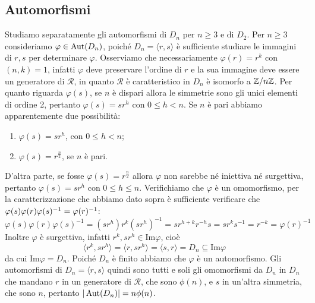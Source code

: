 \documentclass[11pt]{scrartcl}
\begin{document}
\subsection{Automorfismi}

Studiamo separatamente gli automorfismi di $D_n$ per $n \geqslant 3$ e di $D_2$.\newline
Per $n\geqslant 3$ consideriamo $\varphi \in \operatorname{Aut}(D_n)$, poiché $D_n = \langle
r, s\rangle$ è sufficiente studiare le immagini di $r, s$ per determinare $\varphi$.
Osserviamo che necessariamente $\varphi(r) = r^k$ con $(n, k) = 1$, infatti 
$\varphi$ deve preservare l'ordine di $r$ e la sua immagine deve essere un 
generatore di $\mathcal{R}$, in quanto $\mathcal{R}$ è caratteristico in $D_n$
è isomorfo a ${\mathbb Z}/n{\mathbb Z}$. Per quanto riguarda $\varphi(s)$, se $n$ è dispari allora le simmetrie
sono gli unici elementi di ordine 2, pertanto $\varphi(s) = sr^h$ con 
$0\leqslant h < n$. Se $n$ è pari abbiamo apparentemente due possibilità:
\begin{enumerate}[(1)]
    \item $\varphi(s) = sr^h$, con $0\leqslant h < n$;
    \item $\varphi(s) = r^{\frac n 2}$, se $n$ è pari.
\end{enumerate}

D'altra parte, se fosse $\varphi(s) = r^{\frac n 2}$ allora $\varphi$ non
sarebbe né iniettiva né surgettiva, pertanto $\varphi(s) = sr^h$ con 
$0\leqslant h \leqslant n$. Verifichiamo che $\varphi$ è un omomorfismo, per la 
caratterizzazione che abbiamo dato sopra è sufficiente verificare che
$\varphi(s)\varphi(r)\varphi(s)^{-1} = \nolinebreak\varphi(r)^{-1}$:
\[
    \varphi(s)\varphi(r)\varphi(s)^{-1} = (sr^h)r^k(sr^h)^{-1} = sr^{h + k}r^{-h}s =
    sr^k s^{-1} = r^{-k} = \varphi(r)^{-1}
\]
Inoltre $\varphi$ è surgettiva, infatti $r^k, sr^h \in \mathrm{Im}\varphi$,
cioè 
\[
    \langle r^k, sr^h\rangle = \langle r, sr^h\rangle = \langle s, r\rangle =
    D_n\subseteq \mathrm{Im}\varphi
\]da cui $\mathrm{Im}\varphi = D_n$. Poiché $D_n$ è finito abbiamo che $\varphi$
è un automorfismo. Gli automorfismi di $D_n = \langle r, s\rangle$ quindi sono
tutti e soli gli omomorfismi da $D_n$ in $D_n$ che mandano $r$ in un generatore
di $\mathcal{R}$, che sono $\phi(n)$, e $s$ in un'altra simmetria, che sono 
$n$, pertanto $|\operatorname{Aut}(D_n)| = n\phi(n)$.\newline
\end{document}
